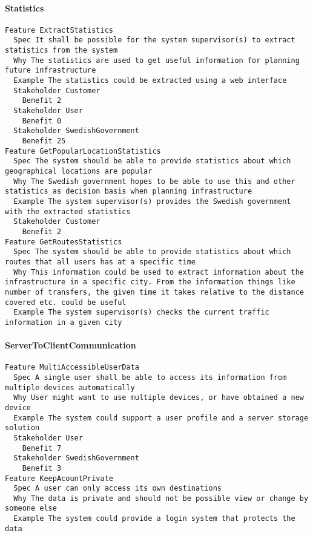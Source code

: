 \begin{lstlisting}

\end{lstlisting}


       \paragraph{Statistics}


\begin{lstlisting}
Feature ExtractStatistics
  Spec It shall be possible for the system supervisor(s) to extract statistics from the system
  Why The statistics are used to get useful information for planning future infrastructure
  Example The statistics could be extracted using a web interface
  Stakeholder Customer
    Benefit 2
  Stakeholder User
    Benefit 0
  Stakeholder SwedishGovernment
    Benefit 25
Feature GetPopularLocationStatistics
  Spec The system should be able to provide statistics about which geographical locations are popular
  Why The Swedish government hopes to be able to use this and other statistics as decision basis when planning infrastructure
  Example The system supervisor(s) provides the Swedish government with the extracted statistics
  Stakeholder Customer
    Benefit 2
Feature GetRoutesStatistics
  Spec The system should be able to provide statistics about which routes that all users has at a specific time
  Why This information could be used to extract information about the infrastructure in a specific city. From the information things like number of transfers, the given time it takes relative to the distance covered etc. could be useful
  Example The system supervisor(s) checks the current traffic information in a given city

\end{lstlisting}
    
        
       \paragraph{ServerToClientCommunication}


\begin{lstlisting}
Feature MultiAccessibleUserData
  Spec A single user shall be able to access its information from multiple devices automatically
  Why User might want to use multiple devices, or have obtained a new device
  Example The system could support a user profile and a server storage solution
  Stakeholder User
    Benefit 7
  Stakeholder SwedishGovernment
    Benefit 3
Feature KeepAcountPrivate
  Spec A user can only access its own destinations
  Why The data is private and should not be possible view or change by someone else
  Example The system could provide a login system that protects the data

\end{lstlisting}
    
